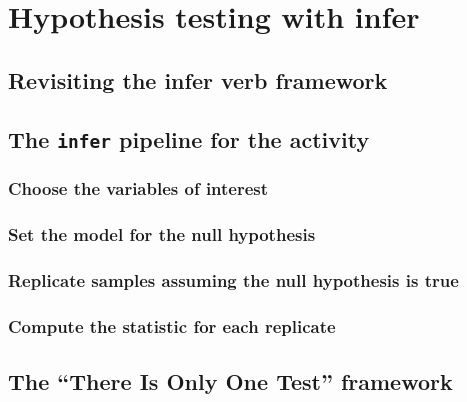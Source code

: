 \documentclass[12pt, krantz2,]{krantz}
\begin{document}
\hypertarget{ht-infer}{%
\section{Hypothesis testing with infer}\label{ht-infer}}

\hypertarget{revisiting-the-infer-verb-framework}{%
\subsection{Revisiting the infer verb framework}\label{revisiting-the-infer-verb-framework}}

\hypertarget{the-infer-pipeline-for-the-activity}{%
\subsection{\texorpdfstring{The \texttt{infer} pipeline for the activity}{The infer pipeline for the activity}}\label{the-infer-pipeline-for-the-activity}}

\hypertarget{choose-the-variables-of-interest}{%
\subsubsection*{Choose the variables of interest}\label{choose-the-variables-of-interest}}


\hypertarget{set-the-model-for-the-null-hypothesis}{%
\subsubsection*{Set the model for the null hypothesis}\label{set-the-model-for-the-null-hypothesis}}


\hypertarget{replicate-samples-assuming-the-null-hypothesis-is-true}{%
\subsubsection*{Replicate samples assuming the null hypothesis is true}\label{replicate-samples-assuming-the-null-hypothesis-is-true}}


\hypertarget{compute-the-statistic-for-each-replicate}{%
\subsubsection*{Compute the statistic for each replicate}\label{compute-the-statistic-for-each-replicate}}


\hypertarget{only-one-test}{%
\subsection{The ``There Is Only One Test'' framework}\label{only-one-test}}
\end{document}
